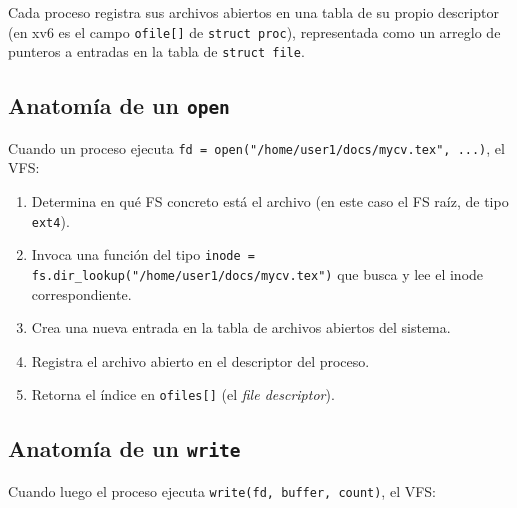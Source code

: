 \documentclass[11pt,a4paper]{article}
\begin{document}
Cada proceso registra sus archivos abiertos en una tabla de su propio
descriptor (en xv6 es el campo \verb|ofile[]| de \verb|struct proc|),
representada como un arreglo de punteros a entradas en la tabla de
\verb|struct file|.

\subsection{Anatomía de un \texttt{open}}

Cuando un proceso ejecuta
\verb|fd = open("/home/user1/docs/mycv.tex", ...)|, el VFS:

\begin{enumerate}[leftmargin=*]
    \item Determina en qué FS concreto está el archivo (en este caso
        el FS raíz, de tipo \texttt{ext4}).
    \item Invoca una función del tipo
        \verb|inode = fs.dir_lookup("/home/user1/docs/mycv.tex")| que
        busca y lee el inode correspondiente.
    \item Crea una nueva entrada en la tabla de archivos abiertos del
        sistema.
    \item Registra el archivo abierto en el descriptor del proceso.
    \item Retorna el índice en \verb|ofiles[]| (el \emph{file
        descriptor}).
\end{enumerate}

\subsection{Anatomía de un \texttt{write}}

Cuando luego el proceso ejecuta \verb|write(fd, buffer, count)|, el
VFS:
\end{document}
